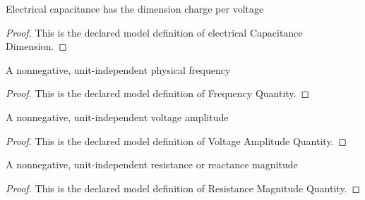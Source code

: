 \begin{definition}
  \label{def:physics:phyx-mini-0887:phyxminiproblems-problemphyxmini0887-electricalcapacitancedimension}
  Electrical capacitance has the dimension charge per voltage
\end{definition}
\begin{proof}
  This is the declared model definition of electrical Capacitance Dimension.
\end{proof}
\begin{definition}
  \label{def:physics:phyx-mini-0887:phyxminiproblems-problemphyxmini0887-frequencyquantity}
  A nonnegative, unit-independent physical frequency
\end{definition}
\begin{proof}
  This is the declared model definition of Frequency Quantity.
\end{proof}
\begin{definition}
  \label{def:physics:phyx-mini-0887:phyxminiproblems-problemphyxmini0887-voltageamplitudequantity}
  A nonnegative, unit-independent voltage amplitude
\end{definition}
\begin{proof}
  This is the declared model definition of Voltage Amplitude Quantity.
\end{proof}
\begin{definition}
  \label{def:physics:phyx-mini-0887:phyxminiproblems-problemphyxmini0887-resistancemagnitudequantity}
  A nonnegative, unit-independent resistance or reactance magnitude
\end{definition}
\begin{proof}
  This is the declared model definition of Resistance Magnitude Quantity.
\end{proof}
